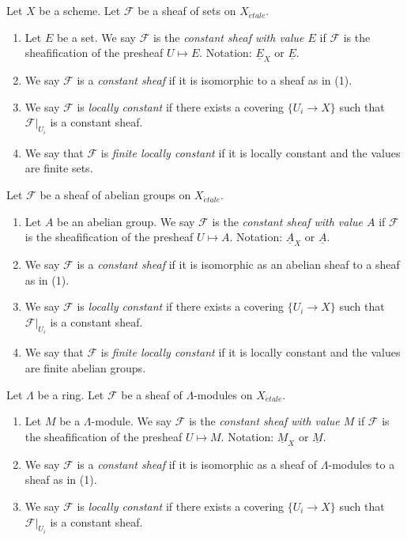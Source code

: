 \begin{definition}
\label{definition-finite-locally-constant}
Let $X$ be a scheme.
Let $\mathcal{F}$ be a sheaf of sets on $X_{\acute{e}tale}$.
\begin{enumerate}
\item Let $E$ be a set. We say $\mathcal{F}$ is the
{\it constant sheaf with value $E$} if $\mathcal{F}$ is the
sheafification of the presheaf $U \mapsto E$.
Notation: $\underline{E}_X$ or $\underline{E}$.
\item We say $\mathcal{F}$ is a {\it constant sheaf} if it is
isomorphic to a sheaf as in (1).
\item We say $\mathcal{F}$ is {\it locally constant} if there exists a
covering $\{U_i \to X\}$ such that $\mathcal{F}|_{U_i}$ is a constant sheaf.
\item We say that $\mathcal{F}$ is {\it finite locally constant} if it
is locally constant and the values are finite sets.
\end{enumerate}
Let $\mathcal{F}$ be a sheaf of abelian groups on $X_{\acute{e}tale}$.
\begin{enumerate}
\item Let $A$ be an abelian group.
We say $\mathcal{F}$ is the {\it constant sheaf with value $A$} if
$\mathcal{F}$ is the sheafification of the presheaf $U \mapsto A$.
Notation: $\underline{A}_X$ or $\underline{A}$.
\item We say $\mathcal{F}$ is a {\it constant sheaf} if it is isomorphic
as an abelian sheaf to a sheaf as in (1).
\item We say $\mathcal{F}$ is {\it locally constant} if there exists a
covering $\{U_i \to X\}$ such that $\mathcal{F}|_{U_i}$ is a constant sheaf.
\item We say that $\mathcal{F}$ is {\it finite locally constant} if it
is locally constant and the values are finite abelian groups.
\end{enumerate}
Let $\Lambda$ be a ring. Let $\mathcal{F}$ be a sheaf of $\Lambda$-modules
on $X_{\acute{e}tale}$.
\begin{enumerate}
\item Let $M$ be a $\Lambda$-module.
We say $\mathcal{F}$ is the {\it constant sheaf with value $M$} if
$\mathcal{F}$ is the sheafification of the presheaf $U \mapsto M$.
Notation: $\underline{M}_X$ or $\underline{M}$.
\item We say $\mathcal{F}$ is a {\it constant sheaf} if it is isomorphic
as a sheaf of $\Lambda$-modules to a sheaf as in (1).
\item We say $\mathcal{F}$ is {\it locally constant} if there exists a
covering $\{U_i \to X\}$ such that $\mathcal{F}|_{U_i}$ is a constant sheaf.
\end{enumerate}
\end{definition}

